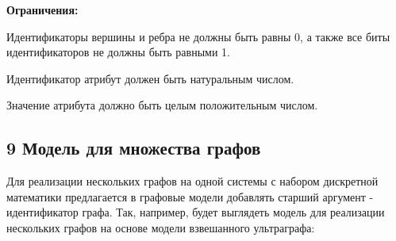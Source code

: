 {\bfseries Ограничения\+:}
\begin{DoxyEnumerate}
\item Идентификаторы вершины и ребра не должны быть равны 0, а также все биты идентификаторов не должны быть равными 1.
\item Идентификатор атрибут должен быть натуральным числом.
\item Значение атрибута должно быть целым положительным числом.
\end{DoxyEnumerate}\hypertarget{md_docs__xD0_x93_xD1_x80_xD0_xB0_xD1_x84_xD0_xBE_xD0_xB2_xD1_x8B_xD0_xB5__xD0_xBC_xD0_xBE_xD0_xB4_xD0_xB5_xD0_xBB_xD0_xB8_autotoc_md12}{}\subsection{9 Модель для множества графов}\label{md_docs__xD0_x93_xD1_x80_xD0_xB0_xD1_x84_xD0_xBE_xD0_xB2_xD1_x8B_xD0_xB5__xD0_xBC_xD0_xBE_xD0_xB4_xD0_xB5_xD0_xBB_xD0_xB8_autotoc_md12}
Для реализации нескольких графов на одной системы с набором дискретной математики предлагается в графовые модели добавлять старший аргумент -\/ идентификатор графа. Так, например, будет выглядеть модель для реализации нескольких графов на основе модели взвешанного ультраграфа\+:


